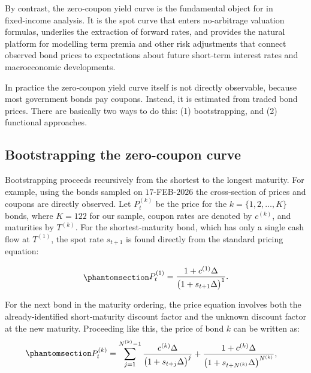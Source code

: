 \documentclass[
  letterpaper,
  DIV=11,
  numbers=noendperiod]{scrreprt}
\begin{document}
By contrast, the zero‑coupon yield curve is the fundamental object for
in fixed‑income analysis. It is the spot curve that enters no‑arbitrage
valuation formulas, underlies the extraction of forward rates, and
provides the natural platform for modelling term premia and other risk
adjustments that connect observed bond prices to expectations about
future short‑term interest rates and macroeconomic developments.

In practice the zero‑coupon yield curve itself is not directly
observable, because most government bonds pay coupons. Instead, it is
estimated from traded bond prices. There are basically two ways to do
this: (1) bootstrapping, and (2) functional approaches.

\subsection{Bootstrapping the zero-coupon
curve}\label{bootstrapping-the-zero-coupon-curve}

Bootstrapping proceeds recursively from the shortest to the longest
maturity. For example, using the bonds sampled on \(17\)-FEB-\(2026\)
the cross‑section of prices and coupons are directly observed. Let
\({P^{(k)}_t}\) be the price for the \(k=\{1,2,\ldots,K\}\) bonds, where
\(K=122\) for our sample, coupon rates are denoted by \({c^{(k)}}\), and
maturities by \({T^{(k)}}\). For the shortest‑maturity bond, which has
only a single cash flow at \(T^{(1)}\), the spot rate \(s_{t+1}\) is
found directly from the standard pricing equation:

\begin{equation}\protect\phantomsection\label{eq-gen-0032}{  
\begin{align}
    P^{(1)}_t = \frac{1 + c^{(1)}\Delta}{\bigl(1+s_{t+1}\Delta\bigr)^{1}} .
\end{align}
}\end{equation}

For the next bond in the maturity ordering, the price equation involves
both the already‑identified short‑maturity discount factor and the
unknown discount factor at the new maturity. Proceeding like this, the
price of bond \(k\) can be written as:
\begin{equation}\protect\phantomsection\label{eq-gen-0033}{  
\begin{align}
    P^{(k)}_t &= \sum_{j=1}^{N^{(k)}-1} \frac{c^{(k)}\Delta}{\bigl(1+s_{t+j}\Delta\bigr)^{j}}
    + \frac{1 + c^{(k)}\Delta} {\bigl(1+s_{t+N^{(k)}}\Delta\bigr)^{N^{(k)}}},
\end{align}
}\end{equation}
\end{document}
